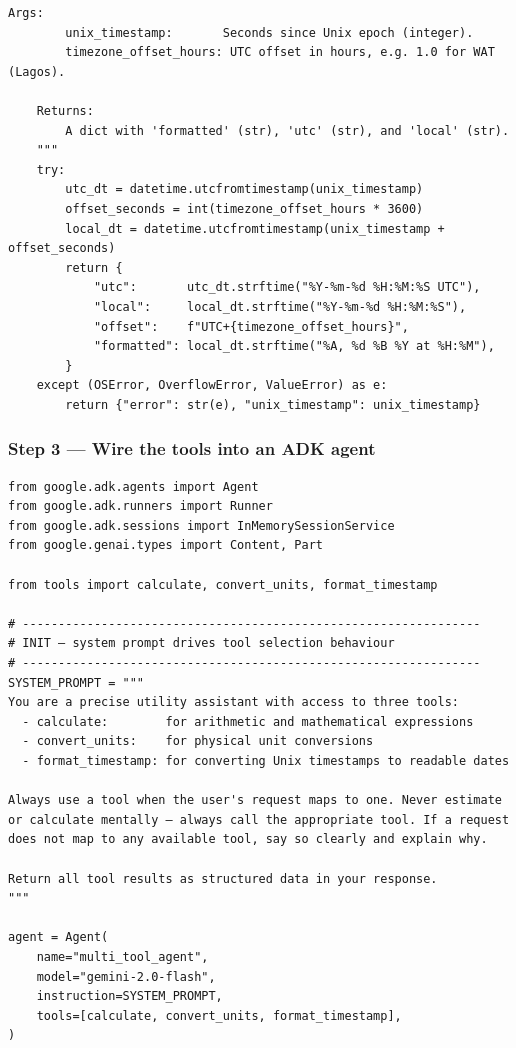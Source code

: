 \documentclass[12pt, a4paper]{article}
\begin{document}
\begin{practicalbox}
\begin{lstlisting}[style=pythonstyle, caption={tools.py --- three custom tools with typed schemas}]
    Args:
        unix_timestamp:       Seconds since Unix epoch (integer).
        timezone_offset_hours: UTC offset in hours, e.g. 1.0 for WAT (Lagos).

    Returns:
        A dict with 'formatted' (str), 'utc' (str), and 'local' (str).
    """
    try:
        utc_dt = datetime.utcfromtimestamp(unix_timestamp)
        offset_seconds = int(timezone_offset_hours * 3600)
        local_dt = datetime.utcfromtimestamp(unix_timestamp + offset_seconds)
        return {
            "utc":       utc_dt.strftime("%Y-%m-%d %H:%M:%S UTC"),
            "local":     local_dt.strftime("%Y-%m-%d %H:%M:%S"),
            "offset":    f"UTC+{timezone_offset_hours}",
            "formatted": local_dt.strftime("%A, %d %B %Y at %H:%M"),
        }
    except (OSError, OverflowError, ValueError) as e:
        return {"error": str(e), "unix_timestamp": unix_timestamp}
\end{lstlisting}

\subsubsection*{Step 3 --- Wire the tools into an ADK agent}

\begin{lstlisting}[style=pythonstyle, caption={multi\_tool\_agent.py --- agent with three registered tools}]
from google.adk.agents import Agent
from google.adk.runners import Runner
from google.adk.sessions import InMemorySessionService
from google.genai.types import Content, Part

from tools import calculate, convert_units, format_timestamp

# ----------------------------------------------------------------
# INIT — system prompt drives tool selection behaviour
# ----------------------------------------------------------------
SYSTEM_PROMPT = """
You are a precise utility assistant with access to three tools:
  - calculate:        for arithmetic and mathematical expressions
  - convert_units:    for physical unit conversions
  - format_timestamp: for converting Unix timestamps to readable dates

Always use a tool when the user's request maps to one. Never estimate
or calculate mentally — always call the appropriate tool. If a request
does not map to any available tool, say so clearly and explain why.

Return all tool results as structured data in your response.
"""

agent = Agent(
    name="multi_tool_agent",
    model="gemini-2.0-flash",
    instruction=SYSTEM_PROMPT,
    tools=[calculate, convert_units, format_timestamp],
)


\end{lstlisting}
\end{practicalbox}
\end{document}
